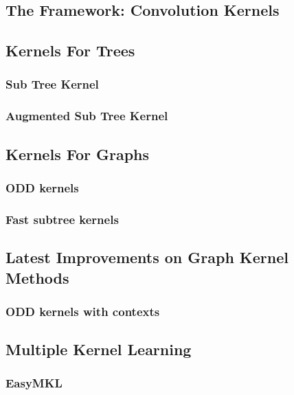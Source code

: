 \subsection{The Framework: Convolution Kernels}
\subsection{Kernels For Trees}
\subsubsection{Sub Tree Kernel}
\subsubsection{Augmented Sub Tree Kernel}

\subsection{Kernels For Graphs}
\subsubsection{ODD kernels}
\subsubsection{Fast subtree kernels}

\subsection{Latest Improvements on Graph Kernel Methods}
\label{subsec:kernel}

\subsubsection{ODD kernels with contexts}

\subsection{Multiple Kernel Learning}
\subsubsection{EasyMKL}


